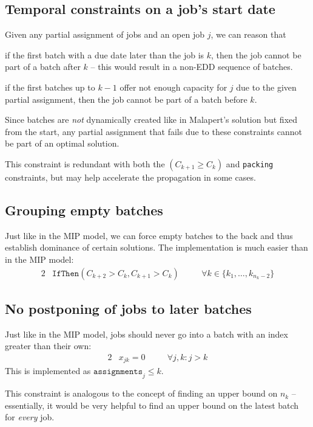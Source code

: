 \subsection{Temporal constraints on a job's start date} Given any partial
assignment of jobs and an open job $j$, we can reason that \begin{alist}
\item{if the first batch with a due date later than the job is $k$, then the job
cannot be part of a batch after $k$ -- this would result in a non-EDD sequence
of batches.} \item{if the first batches up to $k-1$ offer not enough capacity
for $j$ due to the given partial assignment, then the job cannot be part of a
batch before $k$.} \end{alist} Since batches are \textit{not} dynamically
created like in Malapert's solution but fixed from the start, any partial
assignment that fails due to these constraints cannot be part of an optimal
solution.

This constraint is redundant with both the $(C_{k+1}\geq C_k)$ and
\texttt{packing} constraints, but may help accelerate the propagation in some
cases.

\subsection{Grouping empty batches} Just like in the MIP model, we can force
empty batches to the back and thus establish dominance of certain solutions. The
implementation is much easier than in the MIP model: \begin{alignat}{2} &
\mathtt{IfThen}( C_{k+2} > C_{k}, C_{k+1} > C_{k} ) \quad && \forall k \in
\{k_1, \dots, k_{n_k-2}\} \end{alignat}

\subsection{No postponing of jobs to later batches} Just like in the MIP model,
jobs should never go into a batch with an index greater than their own:
\begin{alignat}{2} & x_{jk} = 0 \quad && \forall j,k : j > k \end{alignat} This
is implemented as $\mathtt{assignments}_j \leq k$. 

{\color{darkred} This constraint is analogous to the concept of finding an upper
bound on $n_k$ -- essentially, it would be very helpful to find an upper bound
on the latest batch for \textit{every} job.}


